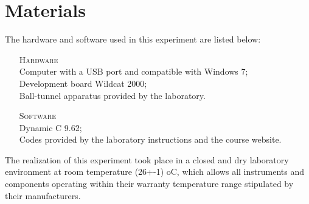 \section{Materials}

The hardware and software used in this experiment are listed below:

\begin{enumerate}[]
\item[\textsc{Hardware}] \hfill
\\ Computer with a USB port and compatible with Windows 7;
\\ Development board Wildcat 2000;
\\ Ball-tunnel apparatus provided by the laboratory.
\\
\item[\textsc{Software}] \hfill
\\ Dynamic C 9.62;
\\ Codes provided by the laboratory instructions and the course website.
\\
\end{enumerate}

The realization of this experiment took place in a closed and dry laboratory environment at room temperature (26+-1)  oC, which allows all instruments and components operating within their warranty temperature range stipulated by their manufacturers.
